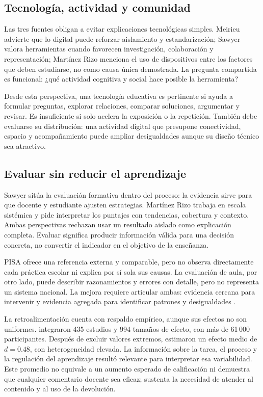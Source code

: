 \documentclass[spanish,letterpaper,oneside]{article}
\begin{document}
\subsection{Tecnología, actividad y comunidad}

Las tres fuentes obligan a evitar explicaciones tecnológicas simples. Meirieu advierte que lo digital puede reforzar aislamiento y estandarización; Sawyer valora herramientas cuando favorecen investigación, colaboración y representación; Martínez Rizo menciona el uso de dispositivos entre los factores que deben estudiarse, no como causa única demostrada. La pregunta compartida es funcional: ¿qué actividad cognitiva y social hace posible la herramienta?

Desde esta perspectiva, una tecnología educativa es pertinente si ayuda a formular preguntas, explorar relaciones, comparar soluciones, argumentar y revisar. Es insuficiente si solo acelera la exposición o la repetición. También debe evaluarse su distribución: una actividad digital que presupone conectividad, espacio y acompañamiento puede ampliar desigualdades aunque su diseño técnico sea atractivo.

\subsection{Evaluar sin reducir el aprendizaje}

Sawyer sitúa la evaluación formativa dentro del proceso: la evidencia sirve para que docente y estudiante ajusten estrategias. Martínez Rizo trabaja en escala sistémica y pide interpretar los puntajes con tendencias, cobertura y contexto. Ambas perspectivas rechazan usar un resultado aislado como explicación completa. Evaluar significa producir información válida para una decisión concreta, no convertir el indicador en el objetivo de la enseñanza.

PISA ofrece una referencia externa y comparable, pero no observa directamente cada práctica escolar ni explica por sí sola sus causas. La evaluación de aula, por otro lado, puede describir razonamientos y errores con detalle, pero no representa un sistema nacional. La mejora requiere articular ambas: evidencia cercana para intervenir y evidencia agregada para identificar patrones y desigualdades \citep{sawyer2008optimizing,martinezRizo2026pisa}.

La retroalimentación cuenta con respaldo empírico, aunque sus efectos no son uniformes. \citet{wisniewski2020feedback} integraron 435 estudios y 994 tamaños de efecto, con más de 61\,000 participantes. Después de excluir valores extremos, estimaron un efecto medio de \(d=0.48\), con heterogeneidad elevada. La información sobre la tarea, el proceso y la regulación del aprendizaje resultó relevante para interpretar esa variabilidad. Este promedio no equivale a un aumento esperado de calificación ni demuestra que cualquier comentario docente sea eficaz; sustenta la necesidad de atender al contenido y al uso de la devolución.
\end{document}
